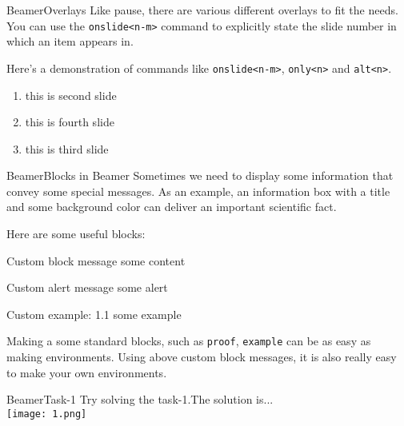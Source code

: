 \begin{frame}{Beamer}{Overlays}
    Like pause, there are various different overlays to fit the needs.
    You can use the \texttt{onslide<n-m>} command to explicitly state the slide
    number in which an item appears in.\vspace{1em}

    Here's a demonstration of commands like  \texttt{onslide<n-m>},
    \texttt{only<n>} and \texttt{alt<n>}. \vspace{1em}

    \begin{enumerate}
         \item this is second slide
         \item this is fourth slide
         \item this is third slide
    \end{enumerate}
\end{frame}

\begin{frame}{Beamer}{Blocks in Beamer}
    \small
    Sometimes we need to display some information that convey some special
    messages. As an example, an information box with a title and some
    background color can deliver an important scientific fact. \vspace{1em}

    Here are some useful blocks: \pause
    \begin{block}{Custom block message}
        some content
    \end{block}
    \pause
    \begin{alertblock}{Custom alert message}
        some alert
    \end{alertblock}
    \pause
    \begin{exampleblock}{Custom example: 1.1}
        some example
    \end{exampleblock}
    \pause
    \footnotesize
    Making a some standard blocks, such as \texttt{proof}, \texttt{example}
    can be as easy as making environments. Using above custom block messages,
    it is also really easy to make your own environments.

\end{frame}


\begin{frame}{Beamer}{Task-1}
    Try solving the task-1.The solution is... \\ \pause
    \vspace{1em}
    \texttt{[image: 1.png]}
\end{frame}
